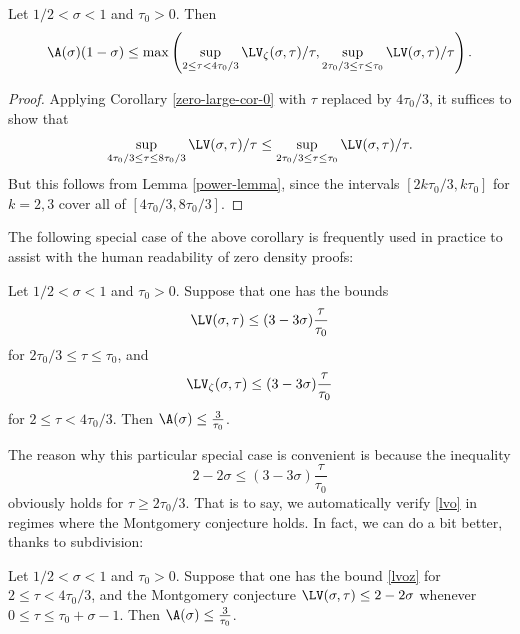 \begin{corollary}\label{zero-large-cor} Let $1/2 < \sigma < 1$ and $\tau_0 > 0$.  Then
$$ \A(\sigma)(1-\sigma) \leq \max \left(\sup_{2 \leq \tau < 4\tau_0/3} \LV_\zeta(\sigma,\tau)/\tau, \sup_{2\tau_0/3 \leq \tau \leq \tau_0} \LV(\sigma,\tau)/\tau\right).$$
\end{corollary}


\begin{proof}  Applying Corollary \ref{zero-large-cor-0} with $\tau$ replaced by $4\tau_0/3$, it suffices to show that
$$\sup_{4\tau_0/3 \leq \tau \leq 8\tau_0/3} \LV(\sigma,\tau)/\tau \leq \sup_{2\tau_0/3 \leq \tau \leq \tau_0} \LV(\sigma,\tau)/\tau.$$
But this follows from Lemma \ref{power-lemma}, since the intervals $[2k\tau_0/3, k\tau_0]$ for $k=2,3$ cover all of $[4\tau_0/3,8\tau_0/3]$.
\end{proof}

The following special case of the above corollary is frequently used in practice to assist with the human readability of zero density proofs:

\begin{corollary}\label{zero-large-cor2} Let $1/2 < \sigma < 1$ and $\tau_0 > 0$.  Suppose that one has the bounds
\begin{equation}\label{lvo}
\LV(\sigma,\tau) \leq (3-3\sigma) \frac{\tau}{\tau_0}
\end{equation}
for $2\tau_0/3 \leq \tau \leq \tau_0$, and
\begin{equation}\label{lvoz}
 \LV_\zeta(\sigma,\tau) \leq (3-3\sigma) \frac{\tau}{\tau_0}
\end{equation}
for $2 \leq \tau < 4\tau_0/3$.  Then $\A(\sigma) \leq \frac{3}{\tau_0}$.
\end{corollary}

The reason why this particular special case is convenient is because the inequality
\begin{equation}\label{obvious}
    2 - 2\sigma \leq (3-3\sigma) \frac{\tau}{\tau_0}
\end{equation}
obviously holds for $\tau \geq 2\tau_0/3$.  That is to say, we automatically verify \eqref{lvo} in regimes where the Montgomery conjecture holds. In fact, we can do a bit better, thanks to subdivision:

\begin{corollary}\label{zero-large-cor3} Let $1/2 < \sigma < 1$ and $\tau_0 > 0$. Suppose that one has the bound \eqref{lvoz}
   for $2 \leq \tau < 4\tau_0/3$, and the Montgomery conjecture $\LV(\sigma,\tau) \leq 2-2\sigma$ whenever $0 \leq \tau \leq \tau_0+\sigma-1$.  Then $\A(\sigma) \leq \frac{3}{\tau_0}$.
\end{corollary}

